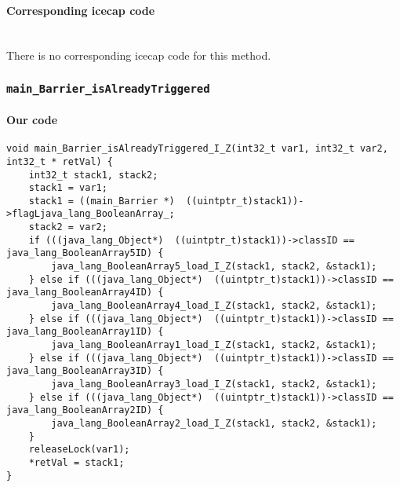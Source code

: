 \paragraph{Corresponding icecap code}\hfill\\
There is no corresponding icecap code for this method.


\subsubsection{\texttt{main\_Barrier\_isAlreadyTriggered}}

\paragraph{Our code}\hfill
\begin{lstlisting}[firstnumber=1270]
void main_Barrier_isAlreadyTriggered_I_Z(int32_t var1, int32_t var2, int32_t * retVal) {
	int32_t stack1, stack2;
	stack1 = var1;
	stack1 = ((main_Barrier *)  ((uintptr_t)stack1))->flagLjava_lang_BooleanArray_;
	stack2 = var2;
	if (((java_lang_Object*)  ((uintptr_t)stack1))->classID == java_lang_BooleanArray5ID) {
		java_lang_BooleanArray5_load_I_Z(stack1, stack2, &stack1);
	} else if (((java_lang_Object*)  ((uintptr_t)stack1))->classID == java_lang_BooleanArray4ID) {
		java_lang_BooleanArray4_load_I_Z(stack1, stack2, &stack1);
	} else if (((java_lang_Object*)  ((uintptr_t)stack1))->classID == java_lang_BooleanArray1ID) {
		java_lang_BooleanArray1_load_I_Z(stack1, stack2, &stack1);
	} else if (((java_lang_Object*)  ((uintptr_t)stack1))->classID == java_lang_BooleanArray3ID) {
		java_lang_BooleanArray3_load_I_Z(stack1, stack2, &stack1);
	} else if (((java_lang_Object*)  ((uintptr_t)stack1))->classID == java_lang_BooleanArray2ID) {
		java_lang_BooleanArray2_load_I_Z(stack1, stack2, &stack1);
	}
	releaseLock(var1);
	*retVal = stack1;
}
\end{lstlisting}


